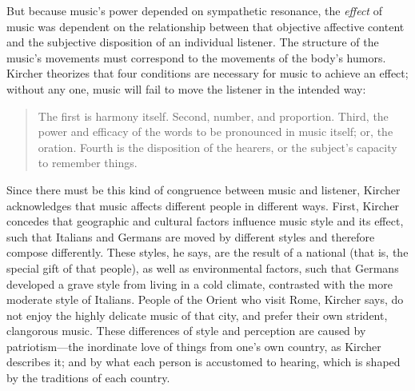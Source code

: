 But because music's power depended on sympathetic resonance, the \emph{effect}
of music was dependent on the relationship between that objective affective
content and the subjective disposition of an individual listener.
The structure of the music's movements must correspond to the movements of the
body's humors.
Kircher theorizes that four conditions are necessary for music to achieve an
effect; without any one, music will fail to move the listener in the intended
way:
\begin{quote}
    The first is harmony itself. Second, number, and proportion. Third, the
    power and efficacy of the words to be pronounced in music itself; or, the
    oration.
    Fourth is the disposition of the hearers, or the subject's capacity to
    remember things.%
        \Autocite
        [550: .]
        {Kircher:Musurgia}
\end{quote}
Since there must be this kind of congruence between music and listener, Kircher
acknowledges that music affects different people in different ways.
First, Kircher concedes that geographic and cultural factors influence music
style and its effect, such that Italians and Germans are moved by different
styles and therefore compose differently.
These styles, he says, are the result of a national  (that is,
the special gift of that people), as well as environmental factors, such that
Germans developed a grave style from living in a cold climate, contrasted with
the more moderate style of Italians.
People of the Orient who visit Rome, Kircher says, do not enjoy the highly
delicate music of that city, and prefer their own strident, clangorous music.
These differences of style and perception are caused by patriotism---the
inordinate love of things from one's own country, as Kircher describes it; and
by what each person is accustomed to hearing, which is shaped by the traditions
of each country.%
    \Autocites
    [543--544]{Kircher:Musurgia}
    [see partial translation in][707--711]{Strunk:SRMH}

